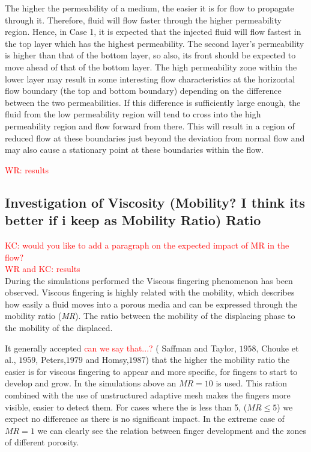 \documentclass[preprint,authoryear,12pt]{elsarticle}
\begin{document}
The higher the permeability of a medium, the easier it is for flow to propagate through it. Therefore, fluid will flow faster through the higher permeability region. Hence, in Case 1, it is expected that the injected fluid will flow fastest in the top layer which has the highest permeability. The second layer's permeability is higher than that of the bottom layer, so also, its front should be expected to move ahead of that of the bottom layer. The high permeability zone within the lower layer may result in some interesting flow characteristics at the horizontal flow boundary (the top and bottom boundary) depending on the difference between the two permeabilities. If this difference is sufficiently large enough, the fluid from the low permeability region will tend to cross into the high permeability region and flow forward from there. This will result in a region of reduced flow at these boundaries just beyond the deviation from normal flow and may also cause a stationary point at these boundaries within the flow.


\medskip
\textcolor{red}{WR: results }

\subsection{Investigation of Viscosity (Mobility? I think its better if i keep as Mobility Ratio) Ratio}\label{section:MobilityAnalysis}
\textcolor{red}{KC: would you like to add a paragraph on the expected impact of MR in the flow?}\\
\medskip
\textcolor{red}{WR and KC: results}\\

During the simulations performed the Viscous fingering phenomenon has been observed. Viscous fingering  is highly related with the mobility, which describes how easily a fluid moves into a porous media and can be expressed through the mobility ratio (\textit{MR}). The ratio between the mobility of the displacing phase to the mobility of the displaced. 

It generally accepted \textcolor{red}{can we say that...?} ( Saffman and Taylor, $1958$, Chouke et al., $1959$, Peters,$1979$ and Homsy,$1987$) that the higher the mobility ratio the easier is for viscous fingering to appear and more specific, for fingers to start to develop and grow. In the simulations above an $MR=10$ is used. This ration combined with the use of unstructured adaptive mesh makes the fingers more visible, easier to detect them. For cases where the is less than 5, ($MR \le 5$) we expect no difference as there is no significant impact. In the extreme case of $MR=1$ we can clearly see the relation between finger development and the zones of different porosity.      
\end{document}
